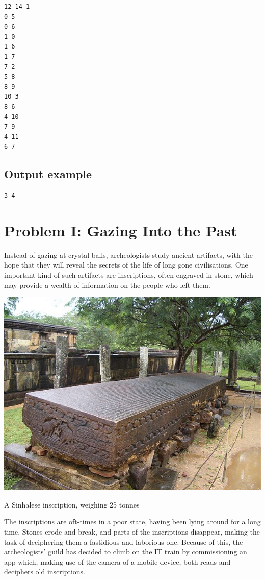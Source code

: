 \documentclass[11pt]{report}
\begin{document}
\begin{verbatim}
12 14 1
0 5
0 6
1 0
1 6
1 7
7 2
5 8
8 9
10 3
8 6
4 10
7 9
4 11
6 7
\end{verbatim}

\subsection*{Output example}

\begin{verbatim}
3 4
\end{verbatim}

\clearpage

\section*{Problem I: Gazing Into the Past}

Instead of gazing at crystal balls, archeologists study ancient
artifacts, with the hope that they will reveal the secrets of the life
of long gone civilisations. One important kind of such artifacts are
inscriptions, often engraved in stone, which may provide a wealth of
information on the people who left them.

\begin{center}
  \includegraphics[width=.7\linewidth,trim=0 0 0 120pt,clip]{galpotha.jpeg}

  \smallskip

  A Sinhalese inscription, weighing 25 tonnes
\end{center}

The inscriptions are oft-times in a poor state, having been lying
around for a long time. Stones erode and break, and parts of the
inscriptions disappear, making the task of deciphering them a
fastidious and laborious one. Because of this, the archeologists'
guild has decided to climb on the IT train by commissioning an app
which, making use of the camera of a mobile device, both reads and
deciphers old inscriptions.
\end{document}
